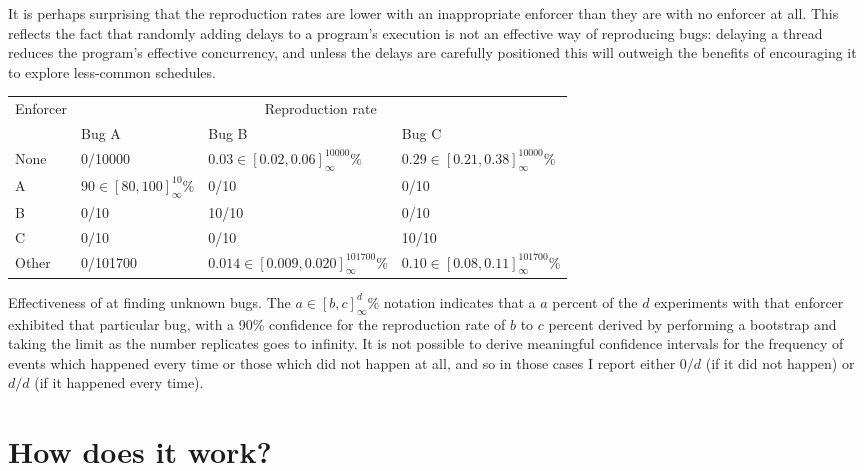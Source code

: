 It is perhaps surprising that the reproduction rates are lower with an
inappropriate enforcer than they are with no enforcer at all.  This
reflects the fact that randomly adding delays to a program's execution
is not an effective way of reproducing bugs: delaying a thread reduces
the program's effective concurrency, and unless the delays are
carefully positioned this will outweigh the benefits of encouraging it
to explore less-common schedules.

\begin{sanetab}
  {\hfill}
\begin{tabular}{|l|l|l|l|}
\hline
Enforcer & \multicolumn{3}{c|}{Reproduction rate} \\\cline{2-4}
         & Bug A                         & Bug B                                    & Bug C \\
\hline
None     & 0/10000                       & $0.03 \in [0.02,0.06]^{10000}_{\infty}\%$     & $0.29 \in [0.21,0.38]^{10000}_{\infty}\%$\\
\hdashline
A        & $90 \in [80,100]^{10}_{\infty}\%$ & 0/10                                     & 0/10 \\
B        & 0/10                          & 10/10                                    & 0/10 \\
C        & 0/10                          & 0/10                                     & 10/10 \\
\hdashline
Other    & 0/101700                      & $0.014 \in [0.009,0.020]^{101700}_{\infty}\%$ & $0.10 \in [0.08,0.11]^{101700}_{\infty}\%$ \\
\hline
\end{tabular}
  {\hfill}
\caption{Effectiveness of {\technique} at finding unknown bugs.  The
  $a \in [b,c]^{d}_{\infty}\%$ notation indicates that a $a$
  percent of the $d$ experiments with that enforcer exhibited that
  particular bug, with a 90\% confidence for the reproduction rate of
  $b$ to $c$ percent derived by performing a bootstrap and taking the
  limit as the number replicates goes to infinity.  It is not possible
  to derive meaningful confidence intervals for the frequency of
  events which happened every time or those which did not happen at
  all, and so in those cases I report either $0/d$ (if it did not
  happen) or $d/d$ (if it happened every time).}
\label{tab:eval:does:finding_unknown}
\end{sanetab}

\section{How does it work?}
\label{sect:eval:how_does_it_work}

